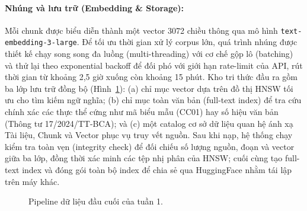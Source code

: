 \documentclass[11pt]{article}
\begin{document}
\paragraph{Nhúng và lưu trữ (Embedding \& Storage): }
Mỗi chunk được biểu diễn thành một vector 3072 chiều thông qua mô hình
\texttt{text-embedding-3-large}. Để tối ưu thời gian xử lý corpus lớn, quá trình nhúng được
thiết kế chạy song song đa luồng (multi-threading) với cơ chế gộp lô (batching) và thử lại
theo exponential backoff để đối phó với giới hạn rate-limit của API, rút thời gian từ khoảng
2,5 giờ xuống còn khoảng 15 phút. Kho tri thức đầu ra gồm ba lớp lưu trữ đồng bộ (Hình~\ref{fig:w1-pipeline}):
(a) chỉ mục vector dựa trên đồ thị HNSW tối ưu cho tìm kiếm ngữ nghĩa; (b) chỉ mục toàn văn
bản (full-text index) để tra cứu chính xác các thực thể cứng như mã biểu mẫu (CC01) hay số
hiệu văn bản (Thông tư 17/2024/TT-BCA); và (c) một catalog cơ sở dữ liệu quan hệ ánh xạ Tài
liệu, Chunk và Vector phục vụ truy vết nguồn. Sau khi nạp, hệ thống chạy kiểm tra toàn vẹn
(integrity check) để đối chiếu số lượng nguồn, đoạn và vector giữa ba lớp, đồng thời xác minh
các tệp nhị phân của HNSW; cuối cùng tạo full-text index và đóng gói toàn bộ index để chia sẻ
qua HuggingFace nhằm tái lập trên máy khác.

\begin{figure}[H]
\centering
{}
\caption{Pipeline dữ liệu đầu cuối của tuần 1.}
\label{fig:w1-pipeline}
\end{figure}
\end{document}
